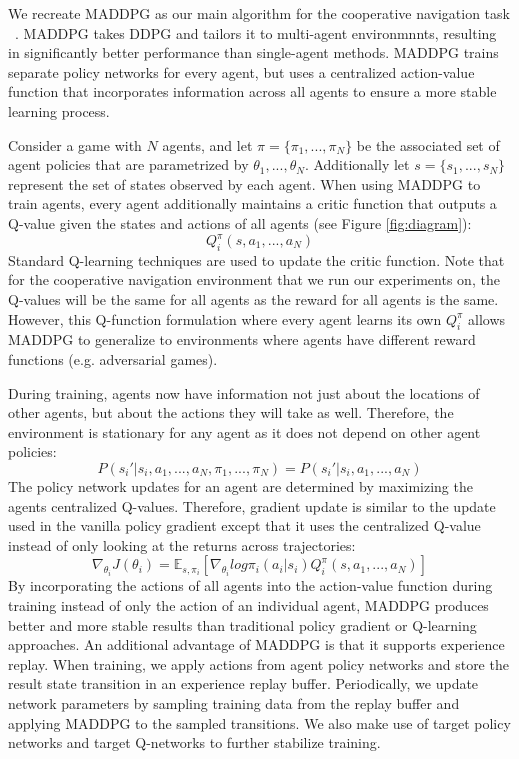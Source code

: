 \documentclass{article}
\begin{document}
We recreate MADDPG as our main algorithm for the cooperative navigation task ~\cite{maddpg}.  MADDPG takes DDPG and tailors it to multi-agent environmnnts, resulting in significantly better performance than single-agent methods. MADDPG trains separate policy networks for every agent, but uses a centralized action-value function that incorporates information across all agents to ensure a more stable learning process. 

Consider a game with $N$ agents, and let $\pi = \{\pi_1, ..., \pi_N\}$ be the associated set of agent policies that are parametrized by $\theta_1, ..., \theta_N$. Additionally let $s = \{s_1, ..., s_N\}$ represent the set of states observed by each agent. When using MADDPG to train agents, every agent additionally maintains a critic function that outputs a Q-value given the states and actions of all agents (see Figure \ref{fig:diagram}):
$$Q^\pi_i(s, a_1, ..., a_N)$$
Standard Q-learning techniques are used to update the critic function. Note that for the cooperative navigation environment that we run our experiments on, the Q-values will be the same for all agents as the reward for all agents is the same. However, this Q-function formulation where every agent learns its own $Q^\pi_i$ allows MADDPG to generalize to environments where agents have different reward functions (e.g. adversarial games).

During training, agents now have information not just about the locations of other agents, but about the actions they will take as well. Therefore, the environment is stationary for any agent as it does not depend on other agent policies:
$$P(s_i'|s_i, a_1, ..., a_N, \pi_1, ..., \pi_N) = P(s_i'|s_i, a_1, ..., a_N)$$
The policy network updates for an agent are determined by maximizing the agents centralized Q-values. Therefore, gradient update is similar to the update used in the vanilla policy gradient except that it uses the centralized Q-value instead of only looking at the returns across trajectories:
$$\nabla_{\theta_i}J(\theta_i) = \mathbb{E}_{s, \pi_i}[\nabla_{\theta_i}log \pi_i(a_i|s_i)Q^{\pi}_i(s, a_1, ..., a_N)]$$
By incorporating the actions of all agents into the action-value function during training instead of only the action of an individual agent, MADDPG produces better and more stable results than traditional policy gradient or Q-learning approaches. An additional advantage of MADDPG is that it supports experience replay. When training, we apply  actions from agent policy networks and store the result state transition in an experience replay buffer. Periodically, we update network parameters by sampling training data from the replay buffer and applying MADDPG to the sampled transitions. We also make use of target policy networks and target Q-networks to further stabilize training.
\end{document}
